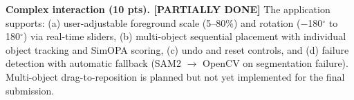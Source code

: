 \documentclass[10pt,twocolumn]{article}
\begin{document}
\textbf{Complex interaction (10 pts). [PARTIALLY DONE]} The application supports: (a) user-adjustable foreground scale (5--80\%) and rotation ($-$180$^\circ$ to 180$^\circ$) via real-time sliders, (b) multi-object sequential placement with individual object tracking and SimOPA scoring, (c) undo and reset controls, and (d) failure detection with automatic fallback (SAM2 $\rightarrow$ OpenCV on segmentation failure). Multi-object drag-to-reposition is planned but not yet implemented for the final submission.

\end{document}

